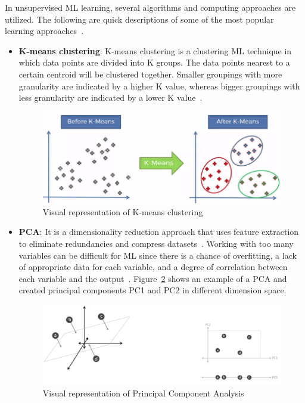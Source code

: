In unsupervised \gls{ML} learning, several algorithms and computing approaches are utilized. The following are quick descriptions of some of the most popular learning approaches~\cite{Chugh2018TypesKnow}.
\begin{itemize}
    \item \textbf{K-means clustering}: K-means clustering is a clustering \gls{ML} technique in which data points are divided into K groups. The data points nearest to a certain centroid will be clustered together. Smaller groupings with more granularity are indicated by a higher K value, whereas bigger groupings with less granularity are indicated by a lower K value~\cite{2020WhatIBMb}.
    
    \begin{figure}[htbp]
        \centering
        \includegraphics[width=0.65\linewidth]{Chapters/Figures/k-means.png}
        \caption{Visual representation of K-means clustering~\cite{Beaumont2020ImageMedium}}
        \label{fig:k-means}
    \end{figure}
    
    \item \textbf{\gls{PCA}}: It is a dimensionality reduction approach that uses feature extraction to eliminate redundancies and compress datasets~\cite{2020WhatIBMb}. Working with too many variables can be difficult for \gls{ML} since there is a chance of overfitting, a lack of appropriate data for each variable, and a degree of correlation between each variable and the output~\cite{Chugh2018TypesKnow}. Figure~\ref{fig:pca} shows an example of a \gls{PCA} and created principal components PC1 and PC2 in different dimension space.
    
    \begin{figure}[htbp]
        \centering
        \includegraphics[width=0.85\linewidth]{Chapters/Figures/pca.png}
        \caption{Visual representation of Principal Component Analysis~\cite{Sah2020MachineTypes}}
        \label{fig:pca}
    \end{figure}
    
\end{itemize}

